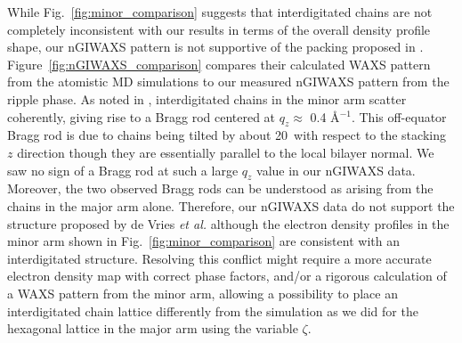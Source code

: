 While Fig.~\ref{fig:minor_comparison}
suggests that interdigitated chains are not completely inconsistent with 
our results in terms of the overall density profile shape, 
our nGIWAXS pattern is not supportive of the packing proposed in 
\cite{ref:deVries05}. Figure~\ref{fig:nGIWAXS_comparison} compares
their calculated WAXS pattern from the atomistic MD simulations
to our measured nGIWAXS pattern from the ripple phase. As noted in
\cite{ref:deVries05}, interdigitated chains in the minor arm scatter
coherently, giving rise to a Bragg rod centered at $q_z \approx$ 0.4 \AA$^{-1}$.
This off-equator Bragg rod is due to chains being tilted by about 20\textdegree\
with respect to the stacking $z$ direction though they
are essentially parallel to the local bilayer normal.
We saw no sign of a Bragg rod at such a large $q_z$ value in our nGIWAXS
data. 
Moreover, the two observed Bragg rods can be understood as arising from
the chains in the major arm alone. 
Therefore, our nGIWAXS data do not support the structure proposed by
de Vries \textit{et al.} \cite{ref:deVries05} although
the electron density profiles in the minor arm shown in 
Fig.~\ref{fig:minor_comparison} are consistent with
an interdigitated structure.
Resolving this conflict might require a more accurate electron density
map with correct phase factors, and/or a rigorous calculation of a WAXS pattern
from the minor arm, 
allowing a possibility to place an interdigitated chain lattice differently from
the simulation as we did for the hexagonal lattice in the major arm 
using the variable $\zeta$. 

